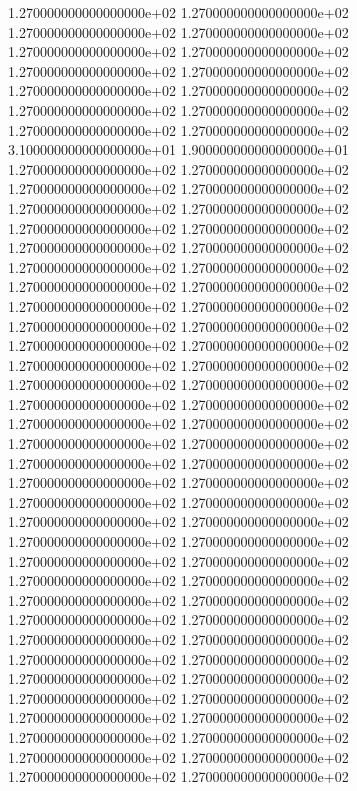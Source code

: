1.270000000000000000e+02 1.270000000000000000e+02 1.270000000000000000e+02 1.270000000000000000e+02 1.270000000000000000e+02 1.270000000000000000e+02 1.270000000000000000e+02 1.270000000000000000e+02 1.270000000000000000e+02 1.270000000000000000e+02 1.270000000000000000e+02 1.270000000000000000e+02 1.270000000000000000e+02 1.270000000000000000e+02 3.100000000000000000e+01 1.900000000000000000e+01 1.270000000000000000e+02 1.270000000000000000e+02 1.270000000000000000e+02 1.270000000000000000e+02 1.270000000000000000e+02 1.270000000000000000e+02 1.270000000000000000e+02 1.270000000000000000e+02 1.270000000000000000e+02 1.270000000000000000e+02 1.270000000000000000e+02 1.270000000000000000e+02 1.270000000000000000e+02 1.270000000000000000e+02 1.270000000000000000e+02 1.270000000000000000e+02 1.270000000000000000e+02 1.270000000000000000e+02 1.270000000000000000e+02 1.270000000000000000e+02 1.270000000000000000e+02 1.270000000000000000e+02 1.270000000000000000e+02 1.270000000000000000e+02 1.270000000000000000e+02 1.270000000000000000e+02 1.270000000000000000e+02 1.270000000000000000e+02 1.270000000000000000e+02 1.270000000000000000e+02 1.270000000000000000e+02 1.270000000000000000e+02 1.270000000000000000e+02 1.270000000000000000e+02 1.270000000000000000e+02 1.270000000000000000e+02 1.270000000000000000e+02 1.270000000000000000e+02 1.270000000000000000e+02 1.270000000000000000e+02 1.270000000000000000e+02 1.270000000000000000e+02 1.270000000000000000e+02 1.270000000000000000e+02 1.270000000000000000e+02 1.270000000000000000e+02 1.270000000000000000e+02 1.270000000000000000e+02 1.270000000000000000e+02 1.270000000000000000e+02 1.270000000000000000e+02 1.270000000000000000e+02 1.270000000000000000e+02 1.270000000000000000e+02 1.270000000000000000e+02 1.270000000000000000e+02 1.270000000000000000e+02 1.270000000000000000e+02 1.270000000000000000e+02 1.270000000000000000e+02 1.270000000000000000e+02 1.270000000000000000e+02 1.270000000000000000e+02 1.270000000000000000e+02
